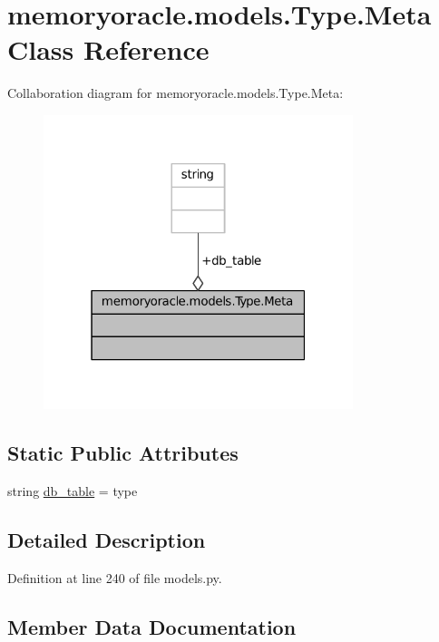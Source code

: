 \hypertarget{classmemoryoracle_1_1models_1_1Type_1_1Meta}{}\section{memoryoracle.\+models.\+Type.\+Meta Class Reference}
\label{classmemoryoracle_1_1models_1_1Type_1_1Meta}


Collaboration diagram for memoryoracle.\+models.\+Type.\+Meta\+:\nopagebreak
\begin{figure}[H]
\begin{center}
\leavevmode
\includegraphics[width=256pt]{classmemoryoracle_1_1models_1_1Type_1_1Meta__coll__graph}
\end{center}
\end{figure}
\subsection*{Static Public Attributes}
\begin{DoxyCompactItemize}
\item 
string \hyperlink{classmemoryoracle_1_1models_1_1Type_1_1Meta_acd32ff6b85b29241422025e87d2b2f0a}{db\+\_\+table} = \textquotesingle{}type\textquotesingle{}
\end{DoxyCompactItemize}


\subsection{Detailed Description}


Definition at line 240 of file models.\+py.



\subsection{Member Data Documentation}
\hypertarget{classmemoryoracle_1_1models_1_1Type_1_1Meta_acd32ff6b85b29241422025e87d2b2f0a}{}

